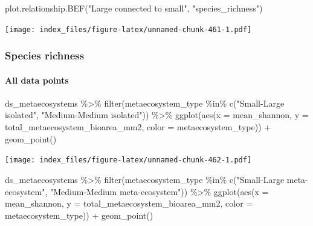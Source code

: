 \documentclass[
]{article}
\newenvironment{Shaded}{\begin{snugshade}}{\end{snugshade}}
\newcommand{\AttributeTok}[1]{\textcolor[rgb]{0.77,0.63,0.00}{#1}}
\newcommand{\FunctionTok}[1]{\textcolor[rgb]{0.00,0.00,0.00}{#1}}
\newcommand{\NormalTok}[1]{#1}
\newcommand{\SpecialCharTok}[1]{\textcolor[rgb]{0.00,0.00,0.00}{#1}}
\newcommand{\StringTok}[1]{\textcolor[rgb]{0.31,0.60,0.02}{#1}}
\begin{document}
\begin{Shaded}
\begin{Highlighting}[]
\FunctionTok{plot.relationship.BEF}\NormalTok{(}\StringTok{"Large connected to small"}\NormalTok{,}
                      \StringTok{"species\_richness"}\NormalTok{)}
\end{Highlighting}
\end{Shaded}

\texttt{[image: index\_files/figure-latex/unnamed-chunk-461-1.pdf]}

\hypertarget{species-richness-4}{%
\subsubsection{Species richness}\label{species-richness-4}}

\hypertarget{all-data-points-1}{%
\paragraph{All data points}\label{all-data-points-1}}

\begin{Shaded}
\begin{Highlighting}[]
\NormalTok{ds\_metaecosystems }\SpecialCharTok{\%\textgreater{}\%}
  \FunctionTok{filter}\NormalTok{(metaecosystem\_type }\SpecialCharTok{\%in\%} \FunctionTok{c}\NormalTok{(}\StringTok{"Small{-}Large isolated"}\NormalTok{,}
                                   \StringTok{"Medium{-}Medium isolated"}\NormalTok{)) }\SpecialCharTok{\%\textgreater{}\%}
  \FunctionTok{ggplot}\NormalTok{(}\FunctionTok{aes}\NormalTok{(}\AttributeTok{x =}\NormalTok{ mean\_shannon,}
             \AttributeTok{y =}\NormalTok{ total\_metaecosystem\_bioarea\_mm2,}
             \AttributeTok{color =}\NormalTok{ metaecosystem\_type)) }\SpecialCharTok{+}
  \FunctionTok{geom\_point}\NormalTok{()}
\end{Highlighting}
\end{Shaded}

\texttt{[image: index\_files/figure-latex/unnamed-chunk-462-1.pdf]}

\begin{Shaded}
\begin{Highlighting}[]
\NormalTok{ds\_metaecosystems }\SpecialCharTok{\%\textgreater{}\%}
  \FunctionTok{filter}\NormalTok{(metaecosystem\_type }\SpecialCharTok{\%in\%} \FunctionTok{c}\NormalTok{(}\StringTok{"Small{-}Large meta{-}ecosystem"}\NormalTok{,}
                                   \StringTok{"Medium{-}Medium meta{-}ecosystem"}\NormalTok{)) }\SpecialCharTok{\%\textgreater{}\%}
  \FunctionTok{ggplot}\NormalTok{(}\FunctionTok{aes}\NormalTok{(}\AttributeTok{x =}\NormalTok{ mean\_shannon,}
             \AttributeTok{y =}\NormalTok{ total\_metaecosystem\_bioarea\_mm2,}
             \AttributeTok{color =}\NormalTok{ metaecosystem\_type)) }\SpecialCharTok{+}
  \FunctionTok{geom\_point}\NormalTok{()}
\end{Highlighting}
\end{Shaded}
\end{document}
